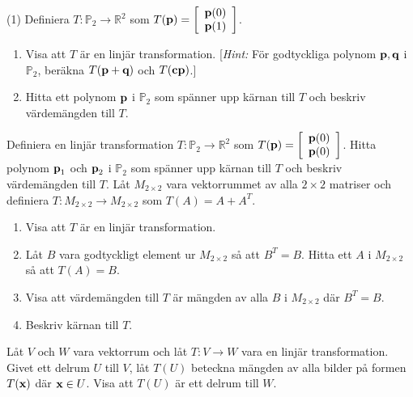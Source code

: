 \documentclass[a4paper]{article}
\newcommand{\bvec}[1]{\normalfont\textbf{#1}}
\begin{document}
\medskip
\setcounter{task}{30}
\begin{tasks}[resume, label={\bf{\arabic*.}}](1)
\task Definiera $T\colon\mathbb{P}_2\to\mathbb{R}^2$ som $T(\bvec{p})=\left[\begin{array}{c}\bvec{p}(0) \\ \bvec{p}(1)\end{array}\right]$.
\begin{enumerate}[label={\alph*)}]
\item Visa att $T$ är en linjär transformation. [\emph{Hint:} För godtyckliga polynom $\bvec{p},\bvec{q}$ i $\mathbb{P}_2$, beräkna $T(\bvec{p}+\bvec{q})$ och $T(\bvec{cp})$.]
\item Hitta ett polynom $\bvec{p}$ i $\mathbb{P}_2$ som spänner upp kärnan till $T$ och beskriv värdemängden till $T$.
\end{enumerate}
\task Definiera en linjär transformation $T\colon\mathbb{P}_2\to\mathbb{R}^2$ som $T(\bvec{p})=\left[\begin{array}{c}\bvec{p}(0) \\ \bvec{p}(0)\end{array}\right]$. Hitta polynom $\bvec{p}_1$ och $\bvec{p}_2$ i $\mathbb{P}_2$ som spänner upp kärnan till $T$ och beskriv värdemängden till $T$.
\task Låt $M_{2\times2}$ vara vektorrummet av alla $2\times2$ matriser och definiera $T\colon M_{2\times2}\to M_{2\times2}$ som $T(A)=A+A^T$.
\begin{enumerate}[label={\alph*)}]
\item Visa att $T$ är en linjär transformation.
\item Låt $B$ vara godtyckligt element ur $M_{2\times2}$ så att $B^T=B$. Hitta ett $A$ i $M_{2\times2}$ så att $T(A)=B$.
\item Visa att värdemängden till $T$ är mängden av alla $B$ i $M_{2\times2}$ där $B^T=B$.
\item Beskriv kärnan till $T$.
\end{enumerate}
\task Låt $V$ och $W$ vara vektorrum och låt $T\colon V\to W$ vara en linjär transformation.  Givet ett delrum $U$ till $V$, låt $T(U)$ beteckna mängden av alla bilder på formen $T(\bvec{x})$ där $\bvec{x}\in U$. Visa att $T(U)$ är ett delrum till $W$.
\setcounter{task}{35}
\end{tasks}
\end{document}
